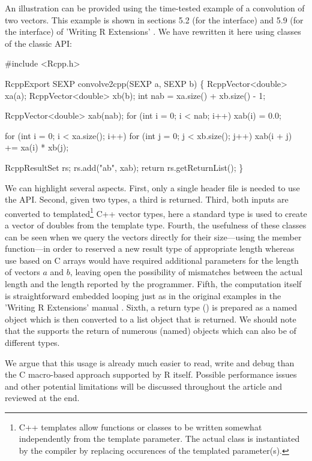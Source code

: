 An illustration can be provided using the time-tested example of a
convolution of two vectors. This example is shown in sections 5.2 (for the
 interface) and 5.9 (for the  interface) of 'Writing
R Extensions' \citep{R:exts}. We have rewritten it here using classes of the
classic  API:

\begin{example}
#include <Rcpp.h>

RcppExport SEXP convolve2cpp(SEXP a, SEXP b) \{
  RcppVector<double> xa(a);
  RcppVector<double> xb(b);
  int nab = xa.size() + xb.size() - 1;

  RcppVector<double> xab(nab);
  for (int i = 0; i < nab; i++) xab(i) = 0.0;

  for (int i = 0; i < xa.size(); i++)
    for (int j = 0; j < xb.size(); j++) 
       xab(i + j) += xa(i) * xb(j);

  RcppResultSet rs;
  rs.add("ab", xab);
  return rs.getReturnList();
\}
\end{example}

We can highlight several aspects. First, only a single header file
 is needed to use the  API.  Second, given two
 types, a third is returned.
Third, both inputs are converted to templated\footnote{C++ templates
allow functions or classes to be written somewhat independently from the 
template parameter. The actual class is instantiated by the compiler
by replacing occurences of the templated parameter(s).}
C++ vector types, here a standard 
type is used to create a vector of doubles from the template type.
Fourth, the usefulness of these classes can be seen when we query the
vectors directly for their size---using the  member function---in
order to reserved a new result type of appropriate length whereas use based
on C arrays would have required additional parameters for the length of
vectors $a$ and $b$, leaving open the possibility of mismatches between the
actual length and the length reported by the programmer. 
Fifth, the computation itself is straightforward embedded looping just as in the
original examples in the 'Writing R Extensions' manual \citep{R:exts}.
Sixth, a return type () is prepared as a named
object which is then
converted to a list object that is returned.  We should note that the
 supports the return of numerous (named) objects which can
also be of different types.

We argue that this usage is already much easier to read, write and debug than the
C macro-based approach supported by R itself. Possible performance issues and
other potential limitations will be discussed throughout the article and
reviewed at the end.

